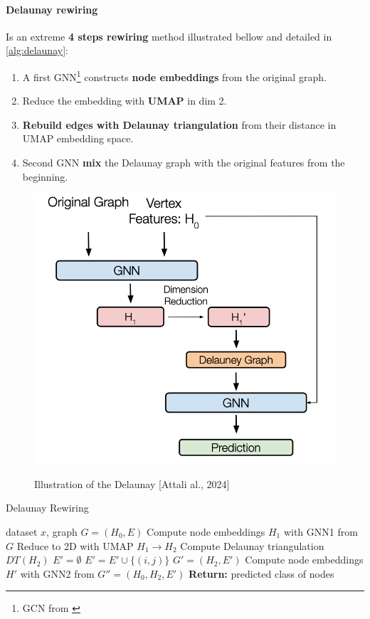 \documentclass{article}
\theoremstyle{plain}
\theoremstyle{definition}
\theoremstyle{remark}
\begin{document}
\paragraph{Delaunay rewiring}
Is an extreme \textbf{4 steps rewiring} method illustrated bellow and detailed 
in \cref{alg:delaunay}:
\begin{enumerate}
    \item A first GNN\footnote{GCN from \cite{kipf2017semi}} constructs 
        \textbf{node embeddings} from the original graph.
    \item Reduce the embedding with \textbf{UMAP} in dim 2.
    \item \textbf{Rebuild edges with Delaunay triangulation} from their distance in UMAP embedding space.
    \item Second GNN \textbf{mix} the Delaunay graph with the original features 
    from the beginning.
\end{enumerate}
\begin{figure}[ht!]
    \begin{center}
    \vskip -0.2in
    \includegraphics[width=0.8\columnwidth]{figures/Rewiring_method_s.png}
    \caption{Illustration of the Delaunay [Attali al., 2024] \cite{attali2024delaunay}}
    \vskip -0.2in
    \label{fig:delaunay_rewiring}
    
    \end{center}
\end{figure}

\begin{algorithm}[htb!]
    \caption{Delaunay Rewiring}
    \label{alg:delaunay}
 \begin{algorithmic}
     dataset $x$, graph $G = (H_0, E)$
    \STATE Compute node embeddings $H_1$ with GNN1 from $G$ 
    \STATE Reduce  to 2D with UMAP $H_1 \to H_2$
    \STATE Compute Delaunay triangulation $DT(H_2)$
    \STATE $E' = \emptyset$
        \STATE $E' = E' \cup \{(i, j)\}$  
    \ENDFOR
    \STATE  $G' = (H_2, E')$  
    \STATE Compute node embeddings $H'$ with GNN2 from $G'' = (H_0, H_2, E')$
    {\bfseries Return:}  predicted class of nodes
 \end{algorithmic}
 \end{algorithm}
\end{document}
